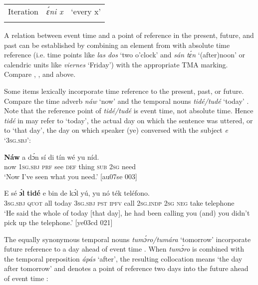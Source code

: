 \begin{table}
\begin{tabularx}{\textwidth}{lXX}
\tablevspace
Iteration & \itshape ɛ́ni x & ‘every x’\\
\lspbottomrule
\end{tabularx}
\end{table}
A relation between event time and a point of reference in the present, future, and past can be established by combining an element from  with absolute time reference (i.e. time points like \textit{las dos} ‘two o’clock’ and \textit{sán tɛ́n} ‘(after)noon’ or calendric units like \textit{viernes} ‘Friday’) with the appropriate TMA marking. Compare , , and  above. 


Some items lexically incorporate time reference to the present, past, or future. Compare the time adverb \textit{náw} ‘now’  and the temporal nouns \textit{tidé/tudé} ‘today’ . Note that the reference point of \textit{tidé/tudé} is event time, not absolute time. Hence \textit{tidé} in  may refer to ‘today’, the actual day on which the sentence was uttered, or to ‘that day’, the day on which speaker (ye) conversed with the subject \textit{e} ‘\textsc{3sg.sbj}’:



\ea%
    \label{ex:key:1008}
    \gll \textbf{Náw}    a    dɔ́n  sí  di  tín    wé  yu  níd.\\
now    \textsc{1sg.sbj}  \textsc{prf}  see  \textsc{def}  thing  \textsc{sub}  \textsc{2sg}  need\\

\glt ‘Now I’ve seen what you need.’ [au07se 003]
\z


\ea%
    \label{ex:key:1009}
    \gll E    sé    \textbf{ɔ́l}  \textbf{tidé}    e    bin  de  kɔ́l  yú,
yu  nó  ték    teléfono.\\
\textsc{3sg.sbj}  \textsc{quot}    all  today  \textsc{3sg.sbj}  \textsc{pst}  \textsc{ipfv}  call  \textsc{2sg.indp}
\textsc{2sg}  \textsc{neg} take    telephone\\

\glt ‘He said the whole of today [that day], he had been calling you (and) you didn’t 
pick up the telephone.’ [ye03cd 021]
\z

The equally synonymous temporal nouns \textit{tumɔ́ro/tumára} ‘tomorrow’ incorporate future reference to a day ahead of event time . When \textit{tumɔ́ro} is combined with the temporal preposition \textit{ápás} ‘after’, the resulting collocation means ‘the day after tomorrow’ and denotes a point of reference two days into the future ahead of event time :


